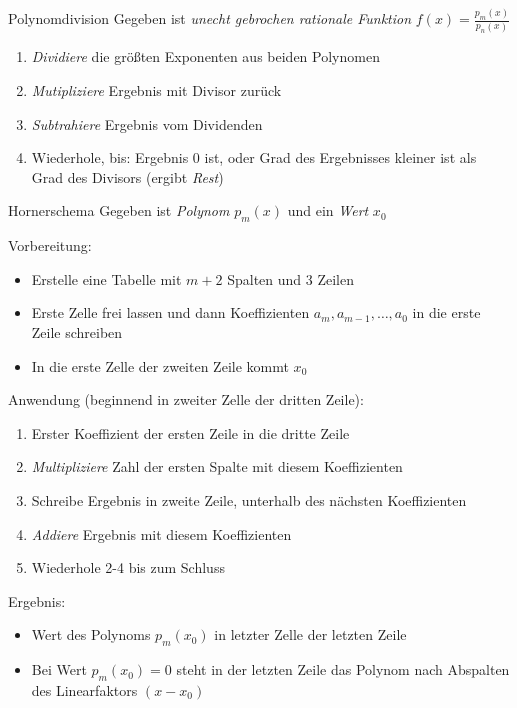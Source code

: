 \documentclass[german]{../spicker}
\begin{document}
\begin{algo}{Polynomdivision}
    Gegeben ist \emph{unecht gebrochen rationale Funktion} $f(x) = \frac{p_m(x)}{p_n(x)}$
    \begin{enumerate}
        \item \emph{Dividiere} die größten Exponenten aus beiden Polynomen
        \item \emph{Mutipliziere} Ergebnis mit Divisor zurück
        \item \emph{Subtrahiere} Ergebnis vom Dividenden
        \item Wiederhole, bis:
              \subitem Ergebnis 0 ist, oder
              \subitem Grad des Ergebnisses kleiner ist als Grad des Divisors (ergibt \emph{Rest})
    \end{enumerate}
\end{algo}


\begin{algo}{Hornerschema}
    Gegeben ist \emph{Polynom} $p_m(x)$ und ein \emph{Wert} $x_0$

    Vorbereitung:
    \begin{itemize}
        \item Erstelle eine Tabelle mit $m + 2$ Spalten und 3 Zeilen
        \item Erste Zelle frei lassen und dann Koeffizienten $a_m, a_{m-1}, \ldots, a_0$ in die erste Zeile schreiben
        \item In die erste Zelle der zweiten Zeile kommt $x_0$
    \end{itemize}

    Anwendung (beginnend in zweiter Zelle der dritten Zeile):
    \begin{enumerate}
        \item Erster Koeffizient der ersten Zeile in die dritte Zeile
        \item \emph{Multipliziere} Zahl der ersten Spalte mit diesem Koeffizienten
        \item Schreibe Ergebnis in zweite Zeile, unterhalb des nächsten Koeffizienten
        \item \emph{Addiere} Ergebnis mit diesem Koeffizienten
        \item Wiederhole 2-4 bis zum Schluss
    \end{enumerate}

    Ergebnis:
    \begin{itemize}
        \item Wert des Polynoms $p_m(x_0)$ in letzter Zelle der letzten Zeile
        \item Bei Wert $p_m(x_0) = 0$ steht in der letzten Zeile das Polynom nach Abspalten des Linearfaktors $(x-x_0)$
    \end{itemize}
\end{algo}
\end{document}
